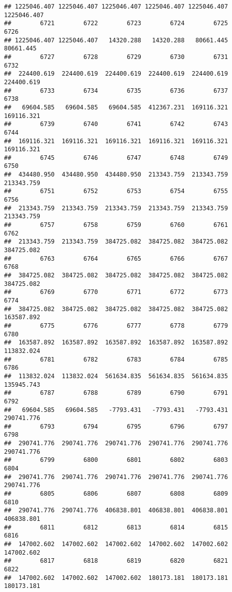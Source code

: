 \documentclass[
]{book}
\begin{document}
\begin{verbatim}
## 1225046.407 1225046.407 1225046.407 1225046.407 1225046.407 1225046.407 
##        6721        6722        6723        6724        6725        6726 
## 1225046.407 1225046.407   14320.288   14320.288   80661.445   80661.445 
##        6727        6728        6729        6730        6731        6732 
##  224400.619  224400.619  224400.619  224400.619  224400.619  224400.619 
##        6733        6734        6735        6736        6737        6738 
##   69604.585   69604.585   69604.585  412367.231  169116.321  169116.321 
##        6739        6740        6741        6742        6743        6744 
##  169116.321  169116.321  169116.321  169116.321  169116.321  169116.321 
##        6745        6746        6747        6748        6749        6750 
##  434480.950  434480.950  434480.950  213343.759  213343.759  213343.759 
##        6751        6752        6753        6754        6755        6756 
##  213343.759  213343.759  213343.759  213343.759  213343.759  213343.759 
##        6757        6758        6759        6760        6761        6762 
##  213343.759  213343.759  384725.082  384725.082  384725.082  384725.082 
##        6763        6764        6765        6766        6767        6768 
##  384725.082  384725.082  384725.082  384725.082  384725.082  384725.082 
##        6769        6770        6771        6772        6773        6774 
##  384725.082  384725.082  384725.082  384725.082  384725.082  163587.892 
##        6775        6776        6777        6778        6779        6780 
##  163587.892  163587.892  163587.892  163587.892  163587.892  113832.024 
##        6781        6782        6783        6784        6785        6786 
##  113832.024  113832.024  561634.835  561634.835  561634.835  135945.743 
##        6787        6788        6789        6790        6791        6792 
##   69604.585   69604.585   -7793.431   -7793.431   -7793.431  290741.776 
##        6793        6794        6795        6796        6797        6798 
##  290741.776  290741.776  290741.776  290741.776  290741.776  290741.776 
##        6799        6800        6801        6802        6803        6804 
##  290741.776  290741.776  290741.776  290741.776  290741.776  290741.776 
##        6805        6806        6807        6808        6809        6810 
##  290741.776  290741.776  406838.801  406838.801  406838.801  406838.801 
##        6811        6812        6813        6814        6815        6816 
##  147002.602  147002.602  147002.602  147002.602  147002.602  147002.602 
##        6817        6818        6819        6820        6821        6822 
##  147002.602  147002.602  147002.602  180173.181  180173.181  180173.181 

\end{verbatim}
\end{document}
